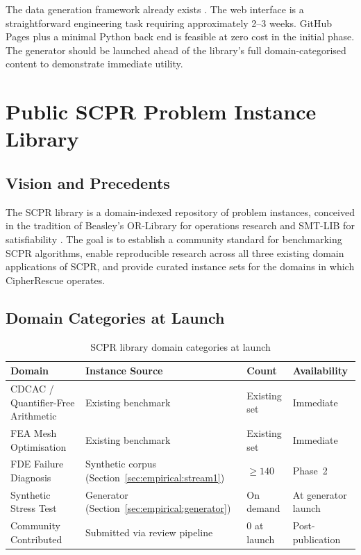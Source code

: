 \documentclass[11pt,a4paper]{report}
\begin{document}
\begin{tcolorbox}[enhanced, colback=lightgreen!40, colframe=forestgreen, arc=4pt,
  fonttitle=\bfseries, title={Viability: High}]
The data generation framework already exists \citep{babatunde2025thesis}. The web
interface is a straightforward engineering task requiring approximately 2--3 weeks.
GitHub Pages plus a minimal Python back end is feasible at zero cost in the initial phase.
The generator should be launched ahead of the library's full domain-categorised content
to demonstrate immediate utility.
\end{tcolorbox}

\section{Public SCPR Problem Instance Library}
\label{sec:empirical:library}

\subsection{Vision and Precedents}

The SCPR library is a domain-indexed repository of problem instances, conceived in the
tradition of Beasley's OR-Library for operations research \citep{beasley1990} and SMT-LIB
for satisfiability \citep{barrett2010smtlib}. The goal is to establish a community
standard for benchmarking SCPR algorithms, enable reproducible research across all three
existing domain applications of SCPR, and provide curated instance sets for the domains in
which CipherRescue operates.

\subsection{Domain Categories at Launch}

\begin{table}[htbp]
\centering
\caption{SCPR library domain categories at launch}
\label{tab:libdomains}
\begin{tabular}{@{}p{4.2cm}p{3.4cm}p{2.2cm}l@{}}
\toprule
\textbf{Domain} & \textbf{Instance Source} & \textbf{Count} & \textbf{Availability} \\
\midrule
CDCAC / Quantifier-Free Arithmetic &
  Existing benchmark \citep{babatunde2025thesis} & Existing set & Immediate \\
FEA Mesh Optimisation &
  Existing benchmark \citep{babatunde2025thesis} & Existing set & Immediate \\
FDE Failure Diagnosis &
  Synthetic corpus (Section~\ref{sec:empirical:stream1}) &
  $\geq 140$ & Phase~2 \\
Synthetic Stress Test &
  Generator (Section~\ref{sec:empirical:generator}) &
  On demand & At generator launch \\
Community Contributed &
  Submitted via review pipeline &
  0 at launch & Post-publication \\
\bottomrule
\end{tabular}
\end{table}
\end{document}
